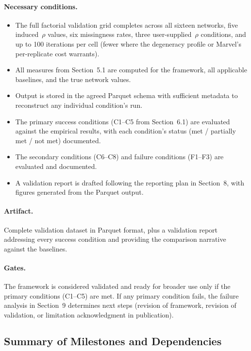 \documentclass[11pt]{article}
\begin{document}
\paragraph{Necessary conditions.}
\begin{itemize}[leftmargin=*, itemsep=2pt]
  \item The full factorial validation grid completes across all sixteen networks, five induced~$\rho$ values, six missingness rates, three user-supplied~$\rho$ conditions, and up to 100 iterations per cell (fewer where the degeneracy profile or Marvel's per-replicate cost warrants).
  \item All measures from Section~5.1 are computed for the framework, all applicable baselines, and the true network values.
  \item Output is stored in the agreed Parquet schema with sufficient metadata to reconstruct any individual condition's run.
  \item The primary success conditions (C1--C5 from Section~6.1) are evaluated against the empirical results, with each condition's status (met / partially met / not met) documented.
  \item The secondary conditions (C6--C8) and failure conditions (F1--F3) are evaluated and documented.
  \item A validation report is drafted following the reporting plan in Section~8, with figures generated from the Parquet output.
\end{itemize}

\paragraph{Artifact.} Complete validation dataset in Parquet format, plus a validation report addressing every success condition and providing the comparison narrative against the baselines.

\paragraph{Gates.} The framework is considered validated and ready for broader use only if the primary conditions (C1--C5) are met. If any primary condition fails, the failure analysis in Section~9 determines next steps (revision of framework, revision of validation, or limitation acknowledgment in publication).

\subsection*{Summary of Milestones and Dependencies}
\end{document}
